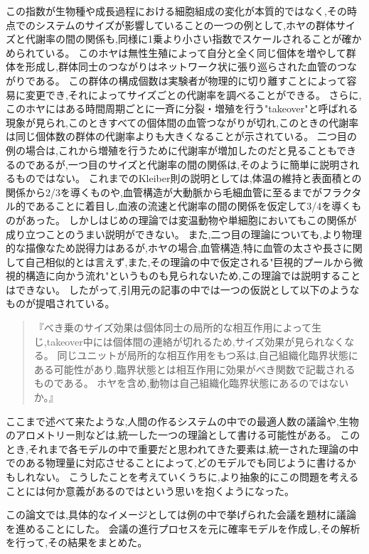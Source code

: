 この指数が生物種や成長過程における細胞組成の変化が本質的ではなく,その時点でのシステムのサイズが影響していることの一つの例として,ホヤの群体サイズと代謝率の間の関係も,同様に1乗より小さい指数でスケールされることが確かめられている。
このホヤは無性生殖によって自分と全く同じ個体を増やして群体を形成し,群体同士のつながりはネットワーク状に張り巡らされた血管のつながりである。
この群体の構成個数は実験者が物理的に切り離すことによって容易に変更でき,それによってサイズごとの代謝率を調べることができる。
さらに,このホヤにはある時間周期ごとに一斉に分裂・増殖を行う"takeover"と呼ばれる現象が見られ,このときすべての個体間の血管つながりが切れ,このときの代謝率は同じ個体数の群体の代謝率よりも大きくなることが示されている。
二つ目の例の場合は,これから増殖を行うために代謝率が増加したのだと見ることもできるのであるが,一つ目のサイズと代謝率の間の関係は,そのように簡単に説明されるものではない。
これまでのKleiber則の説明としては,体温の維持と表面積との関係から2/3を導くものや,血管構造が大動脈から毛細血管に至るまでがフラクタル的であることに着目し,血液の流速と代謝率の間の関係を仮定して3/4を導くものがあった。
しかしはじめの理論では変温動物や単細胞においてもこの関係が成り立つことのうまい説明ができない。
また,二つ目の理論についても,より物理的な描像なため説得力はあるが,ホヤの場合,血管構造,特に血管の太さや長さに関して自己相似的とは言えず,また,その理論の中で仮定される"巨視的プールから微視的構造に向かう流れ"というものも見られないため,この理論では説明することはできない。
したがって,引用元の記事の中では一つの仮説として以下のようなものが提唱されている。

\begin{quote}
『べき乗のサイズ効果は個体同士の局所的な相互作用によって生じ,takeover中には個体間の連絡が切れるため,サイズ効果が見られなくなる。
同じユニットが局所的な相互作用をもつ系は,自己組織化臨界状態にある可能性があり,臨界状態とは相互作用に効果がべき関数で記載されるものである。
ホヤを含め,動物は自己組織化臨界状態にあるのではないか。』
\end{quote}

ここまで述べて来たような,人間の作るシステムの中での最適人数の議論や,生物のアロメトリー則などは,統一した一つの理論として書ける可能性がある。
このとき,それまで各モデルの中で重要だと思われてきた要素は,統一された理論の中でのある物理量に対応させることによって,どのモデルでも同じように書けるかもしれない。
こうしたことを考えていくうちに,より抽象的にこの問題を考えることには何か意義があるのではという思いを抱くようになった。

この論文では,具体的なイメージとしては例の中で挙げられた会議を題材に議論を進めることにした。
会議の進行プロセスを元に確率モデルを作成し,その解析を行って,その結果をまとめた。
